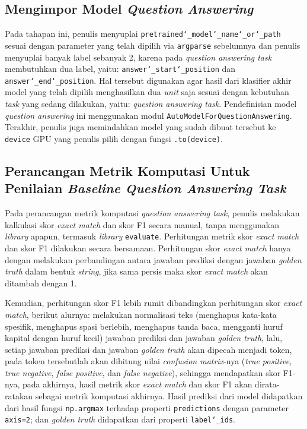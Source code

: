 \subsection{Mengimpor Model \emph{Question Answering}}
\label{4.2.5}
Pada tahapan ini, penulis menyuplai \texttt{pretrained\char`_model\char`_name\char`_or\char`_path} sesuai dengan parameter yang telah dipilih via \texttt{argparse} sebelumnya dan penulis menyuplai banyak label sebanyak 2, karena pada \emph{question answering task} membutuhkan dua label, yaitu: \texttt{answer\char`_start\char`_position} dan \texttt{answer\char`_end\char`_position}. Hal tersebut digunakan agar hasil dari klasifier akhir model yang telah dipilih menghasilkan dua \emph{unit} saja sesuai dengan kebutuhan \emph{task} yang sedang dilakukan, yaitu: \emph{question answering task}. Pendefinisian model \emph{question answering} ini menggunakan modul \texttt{AutoModelForQuestionAnswering}. Terakhir, penulis juga memindahkan model yang sudah dibuat tersebut ke \texttt{device} GPU yang penulis pilih dengan fungsi \texttt{.to(device)}.

\subsection{Perancangan Metrik Komputasi Untuk Penilaian \emph{Baseline Question Answering Task}}
\label{4.2.6}
Pada perancangan metrik komputasi \emph{question answering task}, penulis melakukan kalkulasi skor \emph{exact match} dan skor F1 secara manual, tanpa menggunakan \emph{library} apapun, termasuk \emph{library} \texttt{evaluate}. Perhitungan metrik skor \emph{exact match} dan skor F1 dilakukan secara bersamaan. Perhitungan skor \emph{exact match} hanya dengan melakukan perbandingan antara jawaban prediksi dengan jawaban \emph{golden truth} dalam bentuk \emph{string}, jika sama persis maka skor \emph{exact match} akan ditambah dengan 1. 

Kemudian, perhitungan skor F1 lebih rumit dibandingkan perhitungan skor \emph{exact match}, berikut alurnya: melakukan normalisasi teks (menghapus kata-kata spesifik, menghapus spasi berlebih, menghapus tanda baca, mengganti huruf kapital dengan huruf kecil) jawaban prediksi dan jawaban \emph{golden truth}, lalu, setiap jawaban prediksi dan jawaban \emph{golden truth} akan dipecah menjadi token, pada token tersebutlah akan dihitung nilai \emph{confusion matrix}-nya (\emph{true positive}, \emph{true negative}, \emph{false positive}, dan \emph{false negative}), sehingga mendapatkan skor F1-nya, pada akhirnya, hasil metrik skor \emph{exact match} dan skor F1 akan dirata-ratakan sebagai metrik komputasi akhirnya. Hasil prediksi dari model didapatkan dari hasil fungsi \texttt{np.argmax} terhadap properti \texttt{predictions} dengan parameter \texttt{axis=2}; dan \emph{golden truth} didapatkan dari properti \texttt{label\char`_ids}. 

